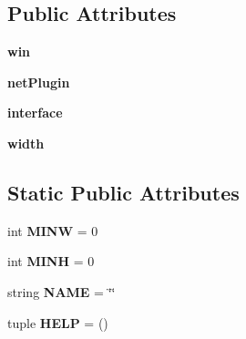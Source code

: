 \subsection*{\-Public \-Attributes}
\begin{DoxyCompactItemize}
\item 
\hypertarget{classplugins_1_1plugincurses_1_1_curses_plugin_a6bce789b5316e34676d0d2a3f3268ae9}{{\bfseries win}}\label{classplugins_1_1plugincurses_1_1_curses_plugin_a6bce789b5316e34676d0d2a3f3268ae9}

\item 
\hypertarget{classplugins_1_1plugincurses_1_1_curses_plugin_a91ef0d7f6bf9039836a1d99bcfe69ea1}{{\bfseries net\-Plugin}}\label{classplugins_1_1plugincurses_1_1_curses_plugin_a91ef0d7f6bf9039836a1d99bcfe69ea1}

\item 
\hypertarget{classplugins_1_1plugincurses_1_1_curses_plugin_a36a19c75fe901ff81d68fb35048b5498}{{\bfseries interface}}\label{classplugins_1_1plugincurses_1_1_curses_plugin_a36a19c75fe901ff81d68fb35048b5498}

\item 
\hypertarget{classplugins_1_1plugincurses_1_1_curses_plugin_adc1318d78532f6d204e2290ec934f54b}{{\bfseries width}}\label{classplugins_1_1plugincurses_1_1_curses_plugin_adc1318d78532f6d204e2290ec934f54b}

\end{DoxyCompactItemize}
\subsection*{\-Static \-Public \-Attributes}
\begin{DoxyCompactItemize}
\item 
\hypertarget{classplugins_1_1plugincurses_1_1_curses_plugin_ad61b4ee3046c6e4e18a8b141c34f8346}{int {\bfseries \-M\-I\-N\-W} = 0}\label{classplugins_1_1plugincurses_1_1_curses_plugin_ad61b4ee3046c6e4e18a8b141c34f8346}

\item 
\hypertarget{classplugins_1_1plugincurses_1_1_curses_plugin_aaf98cf7e436034e64a826f45788f552c}{int {\bfseries \-M\-I\-N\-H} = 0}\label{classplugins_1_1plugincurses_1_1_curses_plugin_aaf98cf7e436034e64a826f45788f552c}

\item 
\hypertarget{classplugins_1_1plugincurses_1_1_curses_plugin_a3fafd023218d80a52ce065834419af31}{string {\bfseries \-N\-A\-M\-E} = \char`\"{}\char`\"{}}\label{classplugins_1_1plugincurses_1_1_curses_plugin_a3fafd023218d80a52ce065834419af31}

\item 
\hypertarget{classplugins_1_1plugincurses_1_1_curses_plugin_a9485e5b170314ef92c543014a23e5e1c}{tuple {\bfseries \-H\-E\-L\-P} = ()}\label{classplugins_1_1plugincurses_1_1_curses_plugin_a9485e5b170314ef92c543014a23e5e1c}

\end{DoxyCompactItemize}


